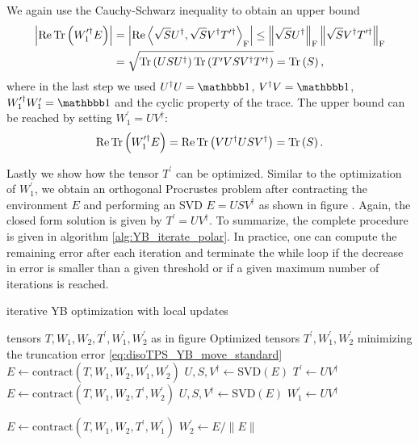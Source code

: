 We again use the Cauchy-Schwarz inequality to obtain an upper bound
\begin{equation}
	\begin{split}
		\left|\operatorname{Re}\operatorname{Tr}\left(W_1^{\prime\dagger}E\right)\right| &= \left|\operatorname{Re}\left\langle\sqrt{S}U^\dagger,\sqrt{S}V^\dagger T^{\prime\dagger}\right\rangle_\text{F}\right| \le \left\lVert\sqrt{S}U^\dagger\right\rVert_\text{F} \left\lVert\sqrt{S}V^\dagger T^{\prime\dagger}\right\rVert_\text{F}\\
		&= \sqrt{\operatorname{Tr}\left(USU^\dagger\right)\operatorname{Tr}\left(T^\prime VSV^\dagger T^{\prime\dagger}\right)} = \operatorname{Tr}\left(S\right),		
	\end{split}
\end{equation}
where in the last step we used $U^\dagger U = \id$, $V^\dagger V = \id$, $W_1^{\prime\dagger}W_1^\prime = \id$ and the cyclic property of the trace. The upper bound can be reached by setting $W_1^\prime = UV^\dagger$:
\begin{equation}
	\operatorname{Re}\operatorname{Tr}\left(W_1^{\prime\dagger}E\right) = \operatorname{Re}\operatorname{Tr}\left(VU^\dagger USV^\dagger\right) = \operatorname{Tr}\left(S\right).
\end{equation}\par
Lastly we show how the tensor $T^\prime$ can be optimized. Similar to the optimization of $W_1^\prime$, we obtain an orthogonal Procrustes problem after contracting the environment $E$ and performing an SVD $E = USV^\dagger$ as shown in figure . Again, the closed form solution is given by $T^\prime = UV^\dagger$. To summarize, the complete procedure is given in algorithm \ref{alg:YB_iterate_polar}. In practice, one can compute the remaining error after each iteration and terminate the while loop if the decrease in error is smaller than a given threshold or if a given maximum number of iterations is reached.
\begin{algorithm}
	\caption{iterative YB optimization with local updates}
	\label{alg:YB_iterate_polar}
	\begin{algorithmic}
		\Require tensors $T, W_1, W_2, T^\prime, W_1^\prime, W_2^\prime$ as in figure 
		\Ensure Optimized tensors $T^\prime, W_1^\prime, W_2^\prime$ minimizing the truncation error \eqref{eq:disoTPS_YB_move_standard}
		\State $E \gets \text{contract}\left(T, W_1, W_2, W_1^\prime, W_2^\prime\right)$
		\State $U, S, V^\dagger \gets \text{SVD}\left(E\right)$
		\State $T^\prime \gets UV^\dagger$
		\State $E \gets \text{contract}\left(T, W_1, W_2, T^\prime, W_2^\prime\right)$
		\State $U, S, V^\dagger \gets \text{SVD}\left(E\right)$
		\State $W_1^\prime \gets UV^\dagger$
		
		\State $E \gets \text{contract}\left(T, W_1, W_2, T^\prime, W_1^\prime\right)$
		\State $W_2^\prime \gets E/\lVert E\rVert$
		\EndWhile
	\end{algorithmic}
\end{algorithm}
